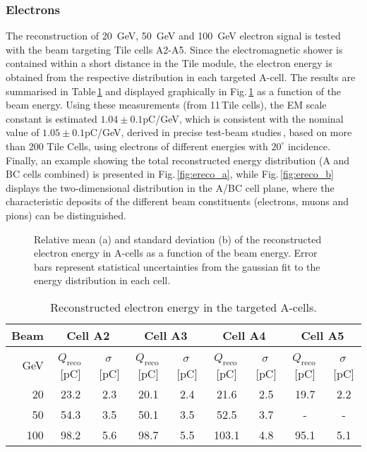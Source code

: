 \subsubsection*{Electrons}

The reconstruction of \SI{20}{GeV}, \SI{50}{GeV} and \SI{100}{GeV} electron signal is tested with the beam targeting Tile cells 
A2-A5. Since the electromagnetic shower is contained within a short distance in the Tile module, the electron energy is obtained
from the respective distribution in each targeted A-cell. The results are summarised in Table\,\ref{tab:elecs} and displayed 
graphically in Fig.\,\ref{fig:elec_reso} as a function of the beam energy. Using these measurements (from 11\,Tile cells), the 
EM scale constant is estimated $1.04\pm 0.1$\si{pC/GeV}, which is consistent with the nominal value of $1.05\pm 0.1$\si{pC/GeV}, 
derived in precise test-beam studies\,\cite{Adragna:2009zz}, based on more than 200 Tile Cells, using electrons of different
energies with $20^{\circ}$ incidence. Finally, an example showing the total reconstructed energy distribution (A and BC cells 
combined) is presented in Fig.\,\ref{fig:ereco_a}, while Fig.\,\ref{fig:ereco_b} displays the two-dimensional distribution in 
the A/BC cell plane, where the characteristic deposits of the different beam constituents (electrons, muons and pions) can be distinguished.

\begin{figure}[tb]
  \centering
  \caption{Relative mean (a) and standard deviation (b) of the reconstructed electron energy in A-cells as a function of 
  the beam energy. Error bars represent statistical uncertainties from the gaussian fit to the energy distribution in each cell.}
  \label{fig:elec_reso}
\end{figure}

\begin{table}[h]
  \begin{center}{\small
  \begin{tabular}{ r c c c c c c c c }
  {\bfseries Beam} & \multicolumn{2}{c}{\bfseries Cell A2} & \multicolumn{2}{c}{\bfseries Cell A3} & \multicolumn{2}{c}{\bfseries Cell A4} & \multicolumn{2}{c}{\bfseries Cell A5}\\
  \toprule
  GeV & $Q_\text{reco}$\,[pC] & $\sigma$\,[pC] & $Q_\text{reco}$\,[pC] & $\sigma$\,[pC] & $Q_\text{reco}$\,[pC] & $\sigma$\,[pC] & $Q_\text{reco}$\,[pC] & $\sigma$\,[pC]\\
   20   & 23.2 & 2.3  &  20.1 & 2.4  &  21.6 & 2.5  &  19.7 & 2.2\\
   50   & 54.3 & 3.5  &  50.1 & 3.5  &  52.5 & 3.7  &  -    & -  \\ 
  100   & 98.2 & 5.6  &  98.7 & 5.5  & 103.1 & 4.8  &  95.1 & 5.1\\ 
  \bottomrule
  \end{tabular}}
  \end{center}
  \caption{\label{tab:elecs}Reconstructed electron energy in the targeted A-cells. }
\end{table}

